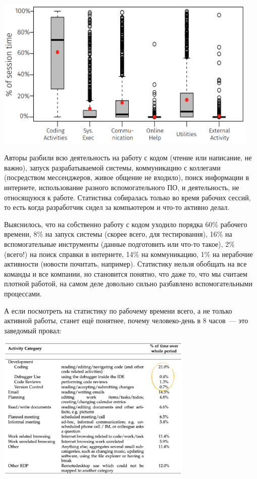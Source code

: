 \documentclass{../../text-style}
\begin{document}
\begin{center}
    \includegraphics[width=0.95\textwidth]{timeSpentDuringWorkingSession.png}
\end{center}

Авторы разбили всю деятельность на работу с кодом (чтение или написание, не важно), запуск разрабатываемой системы, коммуникацию с коллегами (посредством мессенджеров, живое общение не входило), поиск информации в интернете, использование разного вспомогательного ПО, и деятельность, не относящуюся к работе. Статистика собиралась только во время рабочих сессий, то есть когда разработчик сидел за компьютером и что-то активно делал.

Выяснилось, что на собственно работу с кодом уходило порядка 60\% рабочего времени, 8\% на запуск системы (скорее всего, для тестирования), 16\% на вспомогательные инструменты (данные подготовить или что-то такое), 2\% (всего!) на поиск справки в интернете, 14\% на коммуникацию, 1\% на нерабочие активности (новости почитать, например). Статистику нельзя обобщать на все команды и все компании, но становится понятно, что даже то, что мы считаем плотной работой, на самом деле довольно сильно разбавлено вспомогательными процессами.

А если посмотреть на статистику по рабочему времени всего, а не только активной работы, станет ещё понятнее, почему человеко-день в 8 часов~--- это заведомый провал:

\begin{center}
    \includegraphics[width=0.7\textwidth]{timeSpentTotal.png}
\end{center}
\end{document}
